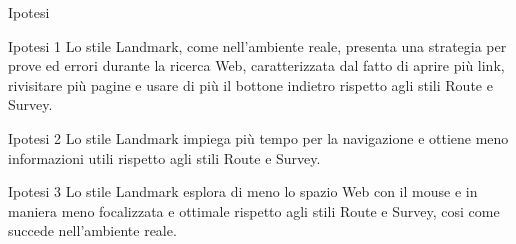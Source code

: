 

\begin{frame}[plain]{\alert{Ipotesi}}
\label{frm:ipotesi:1}

  \begin{block}{Ipotesi 1}
      Lo stile Landmark, come nell’ambiente reale, presenta una strategia per prove ed errori durante la
      ricerca Web, caratterizzata dal fatto di \alert{aprire più link}, \alert{rivisitare più pagine} e usare di più il \alert{bottone
      indietro} rispetto agli stili Route e Survey.
  \end{block}
  \vspace{0.5em}


  \begin{block}{Ipotesi 2}
      Lo stile Landmark impiega \alert{più tempo} per la navigazione e ottiene \alert{meno informazioni} utili rispetto agli
      stili Route e Survey.
  \end{block}
  \vspace{0.5em}


  \begin{block}{Ipotesi 3}
      Lo stile Landmark \alert{esplora di meno lo spazio Web} con il mouse e in maniera \alert{meno focalizzata e ottimale}
      rispetto agli stili Route e Survey, cosi come succede nell'ambiente reale.
  \end{block}

\end{frame}

